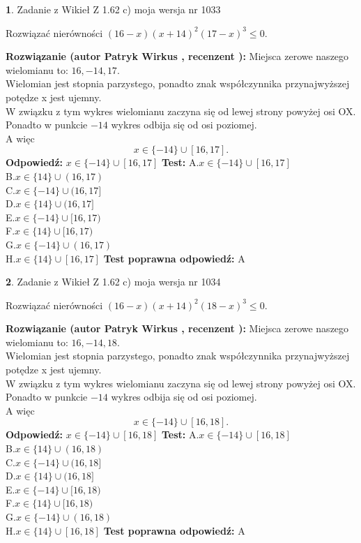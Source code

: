\documentclass[12pt, a4paper]{article}
\theoremstyle{definition} %
\newtheorem{zad}{}
\newcommand{\zadStart}[1]{\begin{zad}#1\newline}
\newcommand{\zadStop}{\end{zad}}
\newcommand{\rozwStart}[2]{\noindent \textbf{Rozwiązanie (autor #1 , recenzent #2): }\newline}
\newcommand{\rozwStop}{\newline}
\newcommand{\odpStart}{\noindent \textbf{Odpowiedź:}\newline}
\newcommand{\odpStop}{\newline}
\newcommand{\testStart}{\noindent \textbf{Test:}\newline}
\newcommand{\testStop}{\newline}
\newcommand{\kluczStart}{\noindent \textbf{Test poprawna odpowiedź:}\newline}
\newcommand{\kluczStop}{\newline}
\begin{document}
\zadStart{Zadanie z Wikieł Z 1.62 c) moja wersja nr 1033}

Rozwiązać nierówności $(16-x)(x+14)^{2}(17-x)^{3}\le0$.
\zadStop
\rozwStart{Patryk Wirkus}{}
Miejsca zerowe naszego wielomianu to: $16, -14, 17$.\\
Wielomian jest stopnia parzystego, ponadto znak współczynnika przy\linebreak najwyższej potędze x jest ujemny.\\ W związku z tym wykres wielomianu zaczyna się od lewej strony powyżej osi OX.\\
Ponadto w punkcie $-14$ wykres odbija się od osi poziomej.\\
A więc $$x \in \{-14\} \cup [16,17].$$
\rozwStop
\odpStart
$x \in \{-14\} \cup [16,17]$
\odpStop
\testStart
A.$x \in \{-14\} \cup [16,17]$\\
B.$x \in \{14\} \cup (16,17)$\\
C.$x \in \{-14\} \cup (16,17]$\\
D.$x \in \{14\} \cup (16,17]$\\
E.$x \in \{-14\} \cup [16,17)$\\
F.$x \in \{14\} \cup [16,17)$\\
G.$x \in \{-14\} \cup (16,17)$\\
H.$x \in \{14\} \cup [16,17]$
\testStop
\kluczStart
A
\kluczStop



\zadStart{Zadanie z Wikieł Z 1.62 c) moja wersja nr 1034}

Rozwiązać nierówności $(16-x)(x+14)^{2}(18-x)^{3}\le0$.
\zadStop
\rozwStart{Patryk Wirkus}{}
Miejsca zerowe naszego wielomianu to: $16, -14, 18$.\\
Wielomian jest stopnia parzystego, ponadto znak współczynnika przy\linebreak najwyższej potędze x jest ujemny.\\ W związku z tym wykres wielomianu zaczyna się od lewej strony powyżej osi OX.\\
Ponadto w punkcie $-14$ wykres odbija się od osi poziomej.\\
A więc $$x \in \{-14\} \cup [16,18].$$
\rozwStop
\odpStart
$x \in \{-14\} \cup [16,18]$
\odpStop
\testStart
A.$x \in \{-14\} \cup [16,18]$\\
B.$x \in \{14\} \cup (16,18)$\\
C.$x \in \{-14\} \cup (16,18]$\\
D.$x \in \{14\} \cup (16,18]$\\
E.$x \in \{-14\} \cup [16,18)$\\
F.$x \in \{14\} \cup [16,18)$\\
G.$x \in \{-14\} \cup (16,18)$\\
H.$x \in \{14\} \cup [16,18]$
\testStop
\kluczStart
A
\kluczStop
\end{document}
